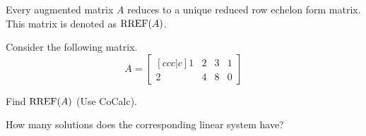 


\newcommand{\drawtruss}[1][1]{%
\begin{center}
\begin{tikzpicture}[scale=#1]
\draw (0,0) -- node[left,magenta]{$1$} (1,1.71) -- node[right,magenta]{$3$} (2,0) -- node[above,magenta]{$2$} cycle;
\draw (2,0) -- node[left,magenta]{$5$} (3,1.71) -- node[above,magenta]{$4$} (1,1.71) -- cycle;
\draw (3,1.71) -- node[right,magenta]{$7$}  (4,0) -- node[above,magenta]{$6$} (2,0) -- cycle;
\draw[blue] (0,0) -- (0.25,-0.425) -- (-0.25,-0.425) -- cycle;
\draw[blue] (4,0) -- (4.25,-0.425) -- (3.75,-0.425) -- cycle;
\draw[thick,red,->] (2,0) --node[right]{10000 N} (2,-0.75);
\end{tikzpicture}
\end{center}
}


\begin{applicationActivities}

\begin{fact}
  Every augmented matrix \(A\) reduces to a unique reduced row echelon form
  matrix. This matrix is denoted as \(\operatorname{RREF}(A)\).
\end{fact}

\begin{activity}{10}
  Consider the following matrix.
  \[
    A = \begin{bmatrix}[ccc|c]
      1 & 2 & 3 & 1\\
      2 & 4 & 8 & 0
    \end{bmatrix}
  \]
  \begin{subactivity}
    Find \(\operatorname{RREF}(A)\) (Use CoCalc).
  \end{subactivity}
  \begin{subactivity}
    How many solutions does the corresponding linear system have?
  \end{subactivity}
\end{activity}


\end{applicationActivities}
